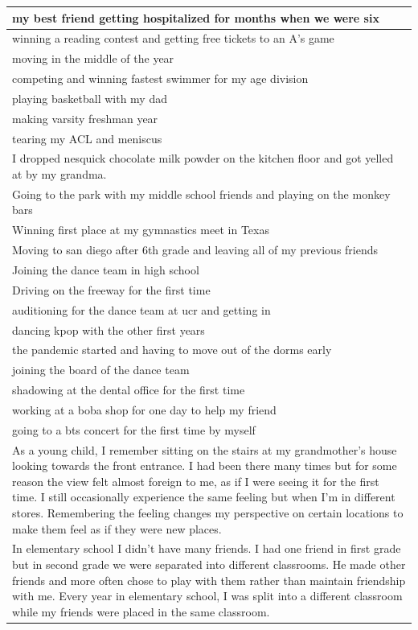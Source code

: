 \documentclass[
  .7em,
  letterpaper,
  DIV=11,
  numbers=noendperiod]{scrartcl}
\begin{document}
\begin{table}
\begin{tabular}{l}
\hline
my best friend getting hospitalized for months when we were six\\
\hline
winning a reading contest and getting free tickets to an A's game\\
\hline
moving in the middle of the year\\
\hline
competing and winning fastest swimmer for my age division\\
\hline
playing basketball with my dad\\
\hline
making varsity freshman year\\
\hline
tearing my ACL and meniscus\\
\hline
I dropped nesquick chocolate milk powder on the kitchen floor and got yelled at by my grandma.\\
\hline
Going to the park with my middle school friends and playing on the monkey bars\\
\hline
Winning first place at my gymnastics meet in Texas\\
\hline
Moving to san diego after 6th grade and leaving all of my previous friends\\
\hline
Joining the dance team in high school\\
\hline
Driving on the freeway for the first time\\
\hline
auditioning for the dance team at ucr and getting in\\
\hline
dancing kpop with the other first years\\
\hline
the pandemic started and having to move out of the dorms early\\
\hline
joining the board of the dance team\\
\hline
shadowing at the dental office for the first time\\
\hline
working at a boba shop for one day to help my friend\\
\hline
going to a bts concert for the first time by myself\\
\hline
As a young child, I remember sitting on the stairs at my grandmother's house looking towards the front entrance. I had been there many times but for some reason the view felt almost foreign to me, as if I were seeing it for the first time. I still occasionally experience the same feeling but when I'm in different stores. Remembering the feeling changes my perspective on certain locations to make them feel as if they were new places.\\
\hline
In elementary school I didn’t have many friends. I had one friend in first grade but in second grade we were separated into different classrooms. He made other friends and more often chose to play with them rather than maintain friendship with me. Every year in elementary school, I was split into a different classroom while my friends were placed in the same classroom.\\

\end{tabular}
\end{table}
\end{document}
